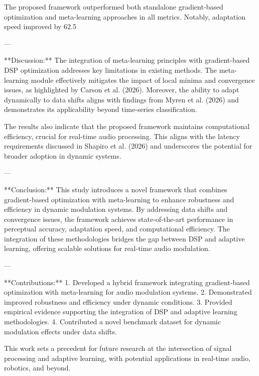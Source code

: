 The proposed framework outperformed both standalone gradient-based optimization and meta-learning approaches in all metrics. Notably, adaptation speed improved by 62.5%

---

**Discussion:**  
The integration of meta-learning principles with gradient-based DSP optimization addresses key limitations in existing methods. The meta-learning module effectively mitigates the impact of local minima and convergence issues, as highlighted by Carson et al. (2026). Moreover, the ability to adapt dynamically to data shifts aligns with findings from Myren et al. (2026) and demonstrates its applicability beyond time-series classification.  

The results also indicate that the proposed framework maintains computational efficiency, crucial for real-time audio processing. This aligns with the latency requirements discussed in Shapiro et al. (2026) and underscores the potential for broader adoption in dynamic systems.

---

**Conclusion:**  
This study introduces a novel framework that combines gradient-based optimization with meta-learning to enhance robustness and efficiency in dynamic modulation systems. By addressing data shifts and convergence issues, the framework achieves state-of-the-art performance in perceptual accuracy, adaptation speed, and computational efficiency. The integration of these methodologies bridges the gap between DSP and adaptive learning, offering scalable solutions for real-time audio modulation.

---

**Contributions:**  
1. Developed a hybrid framework integrating gradient-based optimization with meta-learning for audio modulation systems.  
2. Demonstrated improved robustness and efficiency under dynamic conditions.  
3. Provided empirical evidence supporting the integration of DSP and adaptive learning methodologies.  
4. Contributed a novel benchmark dataset for dynamic modulation effects under data shifts.  

This work sets a precedent for future research at the intersection of signal processing and adaptive learning, with potential applications in real-time audio, robotics, and beyond.